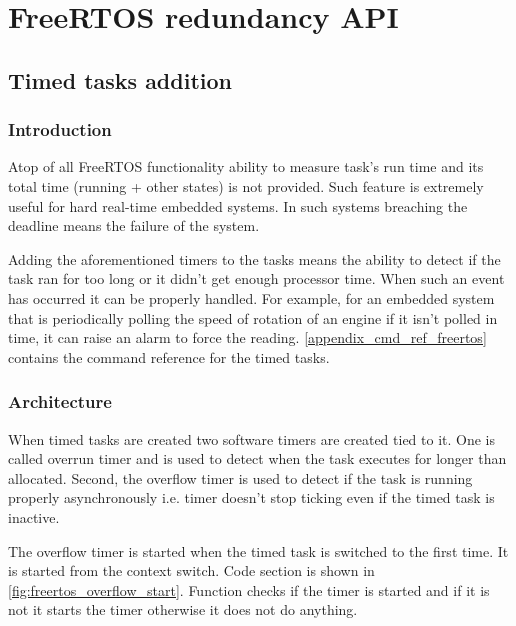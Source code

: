 \chapter{FreeRTOS redundancy API} %
\label{freertos_modification}

\section{Timed tasks addition}

\subsection{Introduction}

Atop of all FreeRTOS functionality ability to measure task's run time and its total time (running + other states) is not provided. Such feature is extremely useful for hard real-time embedded systems. In such systems breaching the deadline means the failure of the system.

Adding the aforementioned timers to the tasks means the ability to detect if the task ran for too long or it didn't get enough processor time. When such an event has occurred it can be properly handled. For example, for an embedded system that is periodically polling the speed of rotation of an engine if it isn't polled in time, it can raise an alarm to force the reading. \autoref{appendix_cmd_ref_freertos} contains the command reference for the timed tasks.

\subsection{Architecture}


When timed tasks are created two software timers are created tied to it. One is called overrun timer and is used to detect when the task executes for longer than allocated. Second, the overflow timer is used to detect if the task is running properly asynchronously i.e. timer doesn't stop ticking even if the timed task is inactive.  

The overflow timer is started when the timed task is switched to the first time. It is started from the context switch. Code section is shown in \autoref{fig:freertos_overflow_start}. Function  checks if the timer is started and if it is not it starts the timer otherwise it does not do anything.


